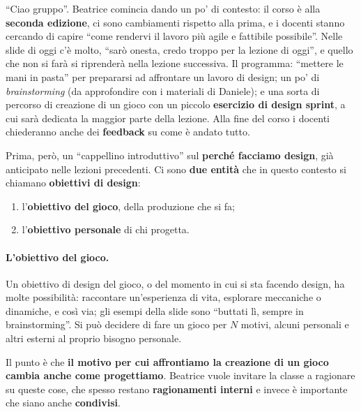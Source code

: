 

``Ciao gruppo''. Beatrice comincia dando un po' di contesto: il corso è alla
\textbf{seconda edizione}, ci sono cambiamenti rispetto alla prima, e i docenti
stanno cercando di capire ``come rendervi il lavoro più agile e fattibile
possibile''. Nelle slide di oggi c'è molto, ``sarò onesta, credo troppo per la
lezione di oggi'', e quello che non si farà si riprenderà nella lezione successiva.
Il programma: ``mettere le mani in pasta'' per prepararsi ad affrontare un lavoro di
design; un po' di \emph{brainstorming} (da approfondire con i materiali di Daniele);
e una sorta di percorso di creazione di un gioco con un piccolo \textbf{esercizio di
design sprint}, a cui sarà dedicata la maggior parte della lezione. Alla fine del
corso i docenti chiederanno anche dei \textbf{feedback} su come è andato tutto.

Prima, però, un ``cappellino introduttivo'' sul \textbf{perché facciamo design}, già
anticipato nelle lezioni precedenti. Ci sono \textbf{due entità} che in questo
contesto si chiamano \textbf{obiettivi di design}:
\begin{enumerate}
  \item l'\textbf{obiettivo del gioco}, della produzione che si fa;
  \item l'\textbf{obiettivo personale} di chi progetta.
\end{enumerate}

\paragraph{L'obiettivo del gioco.} Un obiettivo di design del gioco, o del momento in
cui si sta facendo design, ha molte possibilità: raccontare un'esperienza di vita,
esplorare meccaniche o dinamiche, e così via; gli esempi della slide sono ``buttati
lì, sempre in brainstorming''. Si può decidere di fare un gioco per $N$ motivi, alcuni
personali e altri esterni al proprio bisogno personale.

Il punto è che \textbf{il motivo per cui affrontiamo la creazione di un gioco cambia
anche come progettiamo}. Beatrice vuole invitare la classe a ragionare su queste
cose, che spesso restano \textbf{ragionamenti interni} e invece è importante che
siano anche \textbf{condivisi}.

